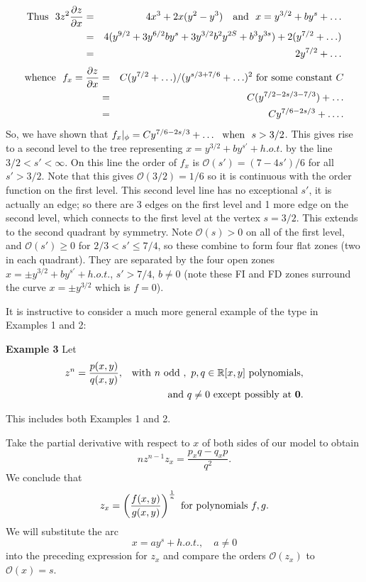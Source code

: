 \documentclass[article]{amsart}
\newcommand{\R}{\mathbb R}
\newcommand{\0}{{\bf 0}}
\begin{document}
\begin{eqnarray*}
{\rm Thus}\ \ 3z^2\frac{\partial z}{\partial x} &=& 4x^3 +2x(y^2 - y^3)\quad {\rm and}\ \ x = y^{3/2} + by^s + \ldots\\
&=&4(y^{9/2}+3y^{6/2}by^s + 3y^{3/2}b^2y^{2S} + b^3y^{3s}) + 2(y^{7/2} + \ldots)\\
&=&2y^{7/2} + \ldots
\end{eqnarray*}
\begin{eqnarray*}
{\rm whence}\ \  f_x = \frac{\partial z}{\partial x} 
  &=& C(y^{7/2} + \ldots)/(y^{s/3 +7/6}+\ldots )^{2}   {\rm \ for\  some \ constant\ 
   } C\\
  &=& C(y^{7/2-2s/3 - 7/3}) +\ldots\\
  &=& Cy^{7/6 - 2s/3} + \ldots .
\end{eqnarray*}
So, we have shown that $f_x|_\phi = Cy^{7/6 - 2s/3} + \ldots \ \ {\rm when} \ \  s > 3/2$.  
 This gives rise to a second level to the tree representing $x=y^{3/2}+by^{s'} + h.o.t.$ by the line $3/2 <s'<\infty$.  On this line the order of $f_x$ is $\mathcal{O}(s')=(7-4s')/6$ for all $s' >3/2 $.  Note that this gives $\mathcal{O}(3/2) = 1/6$ so it is continuous with the order function on the first level. This second level line has no exceptional $s'$, it is actually an edge; so there are 3 edges on the first level and 1 more edge on the second level, which connects to the first level at the vertex $s=3/2$. This extends to the second quadrant by symmetry. Note $\mathcal{O}(s)>0$ on all of the first level, and $\mathcal{O}(s')\ge 0$ for $2/3 < s' \le 7/4$, so these combine to form four flat zones (two in each quadrant).  They are separated by the four open zones $x=\pm y^{3/2}+by^{s'} + h.o.t.$, $s'>7/4$, $b\ne 0$ (note these FI and FD zones surround the curve $x=\pm y^{3/2}$ which is $f=0$).
\smallskip

It is instructive to consider a much more general example of the type in Examples 1 and 2:

{\bf Example 3} 
Let 
\begin{eqnarray*}
z^n = \frac{p(x,y)}{q(x,y)}, &&{\rm with\ }n\ {\rm odd}\ ,\ p, q \in \R[x,y] {\rm \ polynomials},\\ 
&&{\rm and \ } q \ne 0\ {\rm except\ possibly\ at\ } \0.
\end{eqnarray*}

This includes both Examples 1 and 2.  

Take the partial derivative with respect to $x$ of both sides of our model to obtain
$$
nz^{n-1}z_x = \frac{p_xq - q_xp}{q^2}.
$$  
We conclude that 
$$
z_x =\left(\frac{f(x,y)}{g(x,y)}\right)^\frac{1}{n}\ {\rm for\ polynomials\ } f, g.
$$
We will substitute the arc 
$$
x = ay^s + h.o.t., \quad a \ne 0
$$
into the preceding expression for $z_x$ and compare the orders $\mathcal{O}(z_x)$ to  $\mathcal{O}(x) = s$.
\end{document}
